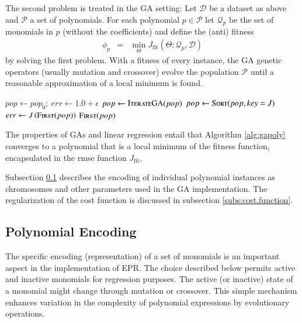 \documentclass[preprint,authoryear,12pt]{elsarticle}
\newcommand{\note}[1]{\textbf{\small{[Note: {#1}]}}}
\begin{document}
The second problem is treated in the \ac{GA} setting: Let $\mathcal{D}$ be a dataset as above and $\mathcal{P}$ a set of polynomials. For each polynomial $p\in \mathcal{P}$ let $\mathcal{Q}_p$ be the set of monomials in $p$ (without the coefficients) and define the (anti) fitness
%
\begin{eqnarray*}
\phi_p &=& \min_\Theta J_{\textrm{fit}}\left(\Theta;\mathcal{Q}_p,\mathcal{D}\right)
\end{eqnarray*}
%
by solving the first problem. With a fitness of every instance, the \ac{GA} genetic operators (usually mutation and crossover) evolve the population $\mathcal{P}$ until a reasonable approximation of a local minimum is found. 
%
\begin{algorithm}[t]
\begin{algorithmic}
	\State $pop \gets pop_0;\: err \gets 1.0+\epsilon$
		\State $pop \gets \Call{IterateGA}{pop}$
		\State $pop \gets \Call{Sort}{pop, key = J}$
		\State $err \gets J\left(\Call{First}{pop}\right)$
	\EndWhile
	\State\Return $\Call{First}{pop}$
\EndFunction
\end{algorithmic}
\caption{This \ac{EPR} algorithm uses linear regression for the calculation of the \ac{rmse} $J$ and the space of polynomials is searched in the \acp{GA} iteration step. At exit the \ac{rmse} of the fittest instance is bounded by $\epsilon$ or the maximum number of allowed iterations.}\label{alg:gapoly}
\end{algorithm} 
%
The properties of \acp{GA} and linear regression entail that Algorithm \ref{alg:gapoly} converges to a polynomial that is a local minimum of the fitness function, encapsulated in the \ac{rmse} function $J_{\textrm{fit}}$.
%

%
Subsection \ref{subs:polynomial.encoding} describes the encoding of individual polynomial instances as chromosomes and other parameters used in the \ac{GA} implementation. The regularization of the cost function is discussed in subsection \ref{subs:cost.function}.

%
\subsection{Polynomial Encoding}\label{subs:polynomial.encoding}
%
%
The specific encoding (representation) of a set of monomials is an important aspect in the implementation of \ac{EPR}. The choice described below permits active and inactive monomials for regression purposes. The active (or inactive) state of a monomial might change through mutation or crossover. This simple mechanism enhances variation in the complexity of polynomial expressions by evolutionary operations.
\end{document}
